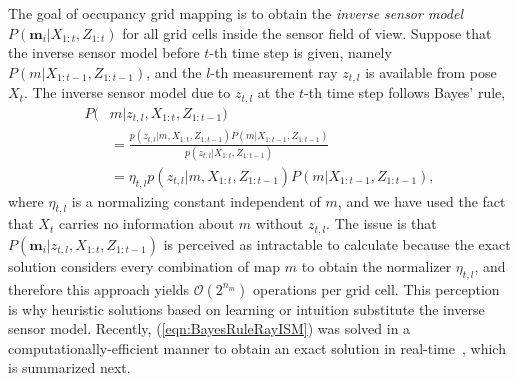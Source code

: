 \documentclass[letterpaper, 10pt, conference]{ieeeconf}
\newcommand{\refeqn}[1]{(\ref{eqn:#1})}
\begin{document}
The goal of occupancy grid mapping is to obtain the \emph{inverse sensor model} $P(\mathbf{m}_i|X_{1:t},Z_{1:t})$ for all grid cells inside the sensor field of view.
Suppose that the inverse sensor model before $t$-th time step is given, namely $P(m|X_{1:t-1},Z_{1:t-1})$, and the $l$-th measurement ray $z_{t,l}$ is available from pose $X_t$.
The inverse sensor model due to $z_{t,l}$ at the $t$-th time step follows Bayes' rule,
\begin{align}
\label{eqn:BayesRuleRayISM}
P(&m|z_{t,l},X_{1:t},Z_{1:t-1})\nonumber
\\
&=\frac{p(z_{t,l}|m,X_{1:t},Z_{1:t-1})P(m|X_{1:t-1},Z_{1:t-1})}{p(z_{t,l}|X_{1:t},Z_{1:t-1})}\nonumber
\\
&=\eta_{t,l}p(z_{t,l}|m,X_{1:t},Z_{1:t-1})P(m|X_{1:t-1},Z_{1:t-1}),
\end{align}
where $\eta_{t,l}$ is a normalizing constant independent of $m$, and we have used the fact that $X_t$ carries no information about $m$ without $z_{t,l}$. The issue is that $P(\mathbf{m}_i|z_{t,l},X_{1:t},Z_{1:t-1})$ is perceived as intractable to calculate because the exact solution considers every combination of map $m$ to obtain the normalizer $\eta_{t,l}$, and therefore this approach yields $\mathcal O(2^{n_m})$ operations per grid cell. This perception is why heuristic solutions based on learning or intuition substitute the inverse sensor model. Recently, \refeqn{BayesRuleRayISM} was solved in a computationally-efficient manner to obtain an exact solution in real-time~\cite{KauLeeAiMos16}, which is summarized next.
\end{document}
